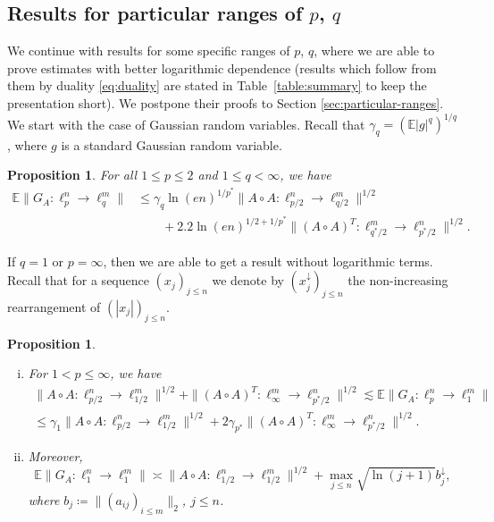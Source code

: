 \documentclass[a4paper]{amsart}
\newtheorem{proposition}[theorem]{Proposition} %
\theoremstyle{definition}
\theoremstyle{remark}
\numberwithin{equation}{section}
\newcommand*{\EE}{\mathbb{E}}
\newcommand*{\hadprod}{\mathbin{\circ}} %
\newcommand*{\rearr}{\downarrow} %
\begin{document}
%
\subsection{Results for particular ranges  of \texorpdfstring{$p$, $q$}{p, q}}
\label{subsec:particular-ranges}
%

We continue with results for some specific ranges of $p$, $q$,
where we are able to prove estimates with better logarithmic
dependence
(results which follow from them by duality \eqref{eq:duality} are stated in Table~\ref{table:summary} to keep the presentation short).
We postpone their proofs to Section \ref{sec:particular-ranges}.
We start with the case of Gaussian random variables.
Recall that $\gamma_q = (\EE |g|^q)^{1/q}$, where $g$ is  a standard Gaussian random variable.




\begin{proposition}
	\label{prop:gauss-p-smaller-2}
For all $1\leq p\leq 2$ and $1\leq q< \infty$, we have
\begin{align}
\label{eq:p-smaller-2-assertion}
\EE \|G_A \colon \ell^n_p\to \ell^m_q\|
& \leq \gamma_q \ln(en)^{1/p^*} \|A\hadprod A \colon \ell^n_{p/2} \to \ell^m_{q/2}\|^{1/2}\\
 &\qquad + 2.2\ln(en)^{1/2+1/p^*}  \|(A\hadprod A)^T \colon \ell^m_{q^*/2} \to \ell^n_{p^*/2}\|^{1/2}. \nonumber
 \end{align}
\end{proposition}





 If $q=1$ or $p=\infty$, then we are able to get a result without logarithmic terms.
Recall that for a sequence $(x_j)_{j\le n}$  we denote by $(x_j^{\rearr{}})_{j\le n}$ the non-increasing rearrangement of $(|x_j|)_{j\le n}$.	

\begin{proposition}
	\label{prop:gauss-q=1} 
	\hfill
	\begin{enumerate}[(i)]
		\item\label{item:prop_q=1_i}
	For $1< p \leq \infty$, we have
		\begin{multline*}
		\|A\hadprod A \colon \ell^n_{p/2} \to \ell^m_{1/2}\|^{1/2} +\|(A\hadprod A)^T \colon \ell^m_{\infty} \to \ell^n_{p^*/2}\|^{1/2}
		\lesssim \EE \|G_A \colon \ell^n_p\to \ell^m_1\|	
		\\
		\leq \gamma_1\|A\hadprod A \colon \ell^n_{p/2} \to \ell^m_{1/2}\|^{1/2} +  2 \gamma_{p^*}  \|(A\hadprod A)^T \colon \ell^m_{\infty} \to \ell^n_{p^*/2}\|^{1/2}.
		\end{multline*}
		\item\label{item:prop_q=1_ii}
		 Moreover,
\begin{equation*}
		\EE \|G_A \colon \ell^n_1\to \ell^m_1\| \asymp \|A\hadprod A \colon \ell^n_{1/2} \to \ell^m_{1/2}\|^{1/2} +  \max_{j\le n}\sqrt{\ln(j+1)} b_j^{\rearr{}},
	\end{equation*}
where $b_j \coloneqq \|(a_{ij})_{i\le m}\|_2$, $j\leq n$.
	 \end{enumerate}
\end{proposition}
\end{document}
